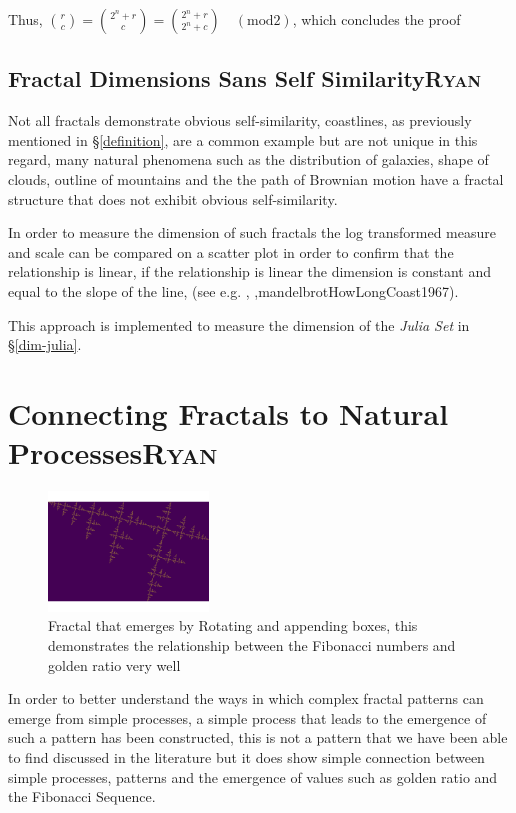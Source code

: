 \documentclass[a4paper,11pt,twoside]{article}
\begin{document}
Thus, \(\binom{r}{c} = \binom{2^n + r}{c} = \binom{2^n + r}{2^n + c} \quad (\text{mod} 2)\), which concludes the proof

\subsection{Fractal Dimensions Sans Self Similarity\hfill{}\textsc{Ryan}}
\label{sans-self}
Not all fractals demonstrate obvious self-similarity, coastlines, as previously
mentioned in \S \ref{definition}, are a common example but are not unique in this
regard, many natural phenomena such as the distribution of galaxies, shape of
clouds, outline of mountains and the the path of Brownian motion have a fractal structure
 \cite[Ch. 2]{gouyetPhysicsFractalStructures1996} that does not exhibit
obvious self-similarity.

In order to measure the dimension of such fractals the log transformed measure
and scale can be compared on a scatter plot in order to confirm that the
relationship is linear, if the relationship is linear the dimension is constant
and equal to the slope of the line, (see e.g. \cite[\S 4.2]{vicsekFractalGrowthPhenomena1992},
\cite{sandersonFractalsAreTypically2017}
,mandelbrotHowLongCoast1967).

This approach is implemented to measure the dimension of the \emph{Julia Set} in \S \ref{dim-julia}.

\section{Connecting Fractals to Natural Processes\hfill{}\textsc{Ryan}}
\label{my-fractal}
\begin{figure}
\centering
\includegraphics[width=0.38\textwidth]{../Problems/fractal-dimensions/my-self-rep-frac-GR.png}
\caption{\label{My-Frac-GR-plot}Fractal that emerges by Rotating and appending boxes, this demonstrates the relationship between the Fibonacci numbers and golden ratio very well}
\end{figure}

In order to better understand the ways in which complex fractal patterns can
emerge from simple processes, a simple process that
leads to the emergence of such a pattern has been constructed, this is not a pattern that we have been able to find discussed in the literature but it does show simple connection between simple processes, patterns and the emergence of values such as golden ratio and the Fibonacci Sequence.
\end{document}
